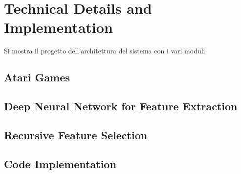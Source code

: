 \chapter{Technical Details and Implementation}
\label{ch5_arch}
\thispagestyle{empty}

\vspace{0.5cm}

\noindent Si mostra il progetto dell'architettura del sistema con i vari moduli.

\section{Atari Games}

\section{Deep Neural Network for Feature Extraction}

\section{Recursive Feature Selection}

\section{Code Implementation}

